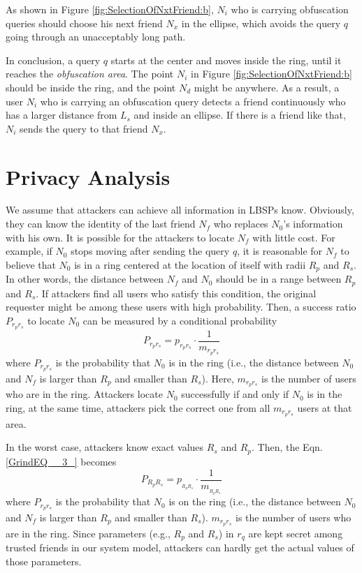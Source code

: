 As shown in Figure \ref{fig:SelectionOfNxtFriend:b}, ${N}_{i}$ who is carrying obfuscation queries should choose his next friend ${N}_{x}$ in the ellipse, which avoids the query $q$ going through an unacceptably long path.

In conclusion, a query $q$ starts at the center and moves inside the ring, until it reaches the \textit{obfuscation area}. The point ${N}_{i}$ in Figure \ref{fig:SelectionOfNxtFriend:b} should be inside the ring, and the point ${N}_{d}$ might be anywhere. As a result, a user ${N}_{i}$ who is carrying an obfuscation query detects a friend continuously who has a larger distance from ${L}_{s}$ and inside an ellipse. If there is a friend like that, ${N}_{i}$ sends the query to that friend ${N}_{x}$.

\section{ Privacy Analysis}

\noindent We assume that attackers can achieve all information in LBSPs know. Obviously, they can know the identity of the last friend $N_f$ who replaces ${N}_{0}$'s information with his own. It is possible for the attackers to locate $N_f$ with little cost. For example, if ${N}_{0}$ stops moving after sending the query $q$, it is reasonable for $N_f$ to believe that ${N}_{0}$ is in a ring centered at the location of itself with radii ${R}_{p}$ and ${R}_{s}$. In other words, the distance between ${N}_{f}$ and ${N}_{0}$ should be in a range between ${R}_{p}$ and ${R}_{s}$. If attackers find all users who satisfy this condition, the original requester might be among these users with high probability. Then, a success ratio $P_{r_pr_s}$ to locate ${N}_{0}$ can be measured by a conditional probability
\begin{equation} \label{GrindEQ__3_} 
P_{r_{p} r_{s} } =p_{r_{p} r_{s} } \cdot \frac{1}{m_{r_{p} r_{s} } }  
\end{equation} 
where $P_{r_pr_s}$ is the probability that ${N}_{0}$ is in the ring (i.e., the distance between ${N}_{0}$ and ${N}_{f}$ is larger than ${R}_{p}$ and smaller than ${R}_{s}$). Here, $m_{r_pr_s}$ is the number of users who are in the ring. Attackers locate ${N}_{0}$ successfully if and only if ${N}_{0}$ is in the ring, at the same time, attackers pick the correct one from all $m_{r_pr_s}$ users at that area.

In the worst case, attackers know exact values $R_s$ and $R_p$. Then, the Eqn. \eqref{GrindEQ__3_} becomes 
\begin{equation} \label{GrindEQ__4_} 
P_{R_{p} R_{s} } =p_{_{R_{p} R_{s} } } \cdot \frac{1}{m_{_{R_{p} R_{s} } } }  
\end{equation} 
where $P_{r_pr_s}$ is the probability that ${N}_{0}$ is on the ring (i.e., the distance between ${N}_{0}$ and ${N}_{f}$ is larger than ${R}_{p}$ and smaller than ${R}_{s}$). $m_{r_pr_s}$ is the number of users who are in the ring. Since parameters (e.g., ${R}_{p}$ and ${R}_{s}$) in ${r}_{q}$ are kept secret among trusted friends in our system model, attackers can hardly get the actual values of those parameters.

